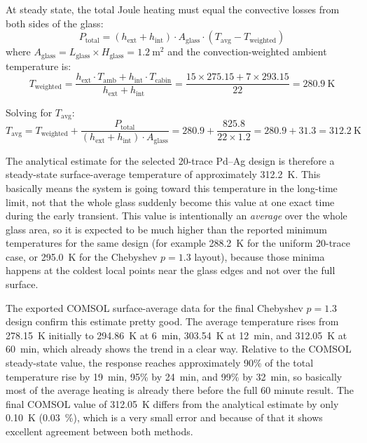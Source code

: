 At steady state, the total Joule heating must equal the convective losses from both sides of the glass:
\begin{equation}
    P_\text{total} = (h_\text{ext} + h_\text{int}) \cdot A_\text{glass} \cdot (T_\text{avg} - T_\text{weighted})
    \label{eq:energy-balance}
\end{equation}
where $A_\text{glass} = L_\text{glass} \times H_\text{glass} = \SI{1.2}{\metre\squared}$ and the convection-weighted ambient temperature is:
\begin{equation}
    T_\text{weighted} = \frac{h_\text{ext} \cdot T_\text{amb} + h_\text{int} \cdot T_\text{cabin}}{h_\text{ext} + h_\text{int}} = \frac{15 \times 275.15 + 7 \times 293.15}{22} = \SI{280.9}{\kelvin}
\end{equation}

Solving for $T_\text{avg}$:
\begin{equation}
    T_\text{avg} = T_\text{weighted} + \frac{P_\text{total}}{(h_\text{ext} + h_\text{int}) \cdot A_\text{glass}} = 280.9 + \frac{825.8}{22 \times 1.2} = 280.9 + 31.3 = \SI{312.2}{\kelvin}
\end{equation}

The analytical estimate for the selected 20-trace Pd--Ag design is therefore a steady-state surface-average temperature of approximately \SI{312.2}{\kelvin}. This basically means the system is going toward this temperature in the long-time limit, not that the whole glass suddenly become this value at one exact time during the early transient. This value is intentionally an \emph{average} over the whole glass area, so it is expected to be much higher than the reported minimum temperatures for the same design (for example \SI{288.2}{\kelvin} for the uniform 20-trace case, or \SI{295.0}{\kelvin} for the Chebyshev $p = 1.3$ layout), because those minima happens at the coldest local points near the glass edges and not over the full surface.

The exported COMSOL surface-average data for the final Chebyshev $p = 1.3$ design confirm this estimate pretty good. The average temperature rises from \SI{278.15}{\kelvin} initially to \SI{294.86}{\kelvin} at \SI{6}{\minute}, \SI{303.54}{\kelvin} at \SI{12}{\minute}, and \SI{312.05}{\kelvin} at \SI{60}{\minute}, which already shows the trend in a clear way. Relative to the COMSOL steady-state value, the response reaches approximately 90\% of the total temperature rise by \SI{19}{\minute}, 95\% by \SI{24}{\minute}, and 99\% by \SI{32}{\minute}, so basically most of the average heating is already there before the full 60 minute result. The final COMSOL value of \SI{312.05}{\kelvin} differs from the analytical estimate by only \SI{0.10}{\kelvin} (\SI{0.03}{\percent}), which is a very small error and because of that it shows excellent agreement between both methods.

